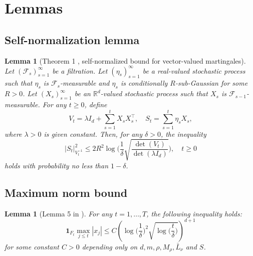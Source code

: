 \documentclass[11pt]{article}
\theoremstyle{plain}
\newtheorem{lem}[thm]{Lemma}
\theoremstyle{definition}
\theoremstyle{remark}
\begin{document}
\section{Lemmas}

\subsection{Self-normalization lemma}\label{app:lem:self_norm}

\begin{lem}[Theorem 1 \cite{abbasi2011improved}, self-normalized bound for vector-valued martingales]\label{lem:self_norm}
Let $(\mathcal{F}_s)_{s=1}^\infty$ be a filtration. Let $(\eta_s)_{s=1}^\infty$ be a real-valued stochastic process such that $\eta_s$ is $\mathcal{F}_s$-measurable and $\eta_s$ is conditionally $R$-sub-Gaussian for some $R>0$. Let $(X_s)_{s=1}^\infty$ be an $\mathbb{R}^d$-valued stochastic process such that $X_{s}$ is $\mathcal{F}_{s-1}$-measurable. For any $t\geq 0$, define
\[
V_t = \lambda I_d + \sum_{s=1}^t X_s X_s^\top ,\quad S_t = \sum _{s=1}^t \eta_s X_s,
\]
where $\lambda >0$ is given constant. Then, for any $\delta>0$, the inequality
\[
|S_t|_{V_t^{-1}}^2 \leq 2R^2 \log \bigg( \frac{1}{\delta} \sqrt{\frac{\det(V_t)}{\det(\lambda I_d)}}\bigg), \quad t \geq 0
\]
holds with probability no less than $1-\delta$. 
\end{lem}

\subsection{Maximum norm bound}
\begin{lem}[Lemma 5 in \cite{abbasi2011regret}]\label{lem:state_log}
For any $t = 1, \ldots, T$, the following inequality holds:
\[
\mathbf{1}_{F_t}\max_{j\leq t}|x_j| \leq C \left(\log\bigg(\frac{1}{\delta}\bigg)^2\sqrt{\log\bigg(\frac{t}{\delta}\bigg)}\right)^{d+1}
\]
for some constant $C > 0$ depending only on $d, m, \rho, M_\rho, \bar{L}_\nu$ and $S$.
\end{lem}
\end{document}
